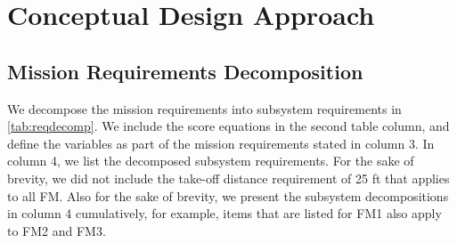 
\section{Conceptual Design Approach} %
\label{sec:ConceptualDesign}



\subsection{Mission Requirements Decomposition}
\label{ssec:MissionReqs}

We decompose the mission requirements into subsystem requirements in \cref{tab:reqdecomp}. We include the score equations in the second table column, and define the variables as part of the mission requirements stated in column 3. In column 4, we list the decomposed subsystem requirements. For the sake of brevity, we did not include the take-off distance requirement of 25 ft that applies to all FM. Also for the sake of brevity, we present the subsystem decompositions in column 4 cumulatively, for example, items that are listed for FM1 also apply to FM2 and FM3.



